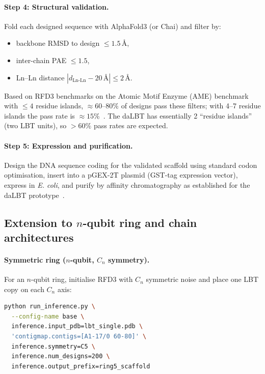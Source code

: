 \documentclass[11pt,oneside]{amsbook}
\numberwithin{equation}{section}
\theoremstyle{plain}
\theoremstyle{definition}
\theoremstyle{remark}
\begin{document}
\paragraph{Step 4: Structural validation.}
Fold each designed sequence with AlphaFold3 (or Chai) and filter by:
\begin{itemize}
  \item backbone RMSD to design $\le 1.5\,\text{\AA}$,
  \item inter-chain PAE $\le 1.5$,
  \item Ln--Ln distance $|d_{\text{Ln-Ln}} - 20\,\text{\AA}| \le 2\,\text{\AA}$.
\end{itemize}
Based on RFD3 benchmarks on the Atomic Motif Enzyme (AME) benchmark with
$\le 4$ residue islands, $\approx 60$--$80\%$ of designs pass these filters;
with 4--7 residue islands the pass rate is $\approx 15$\%~\cite{ButcherEtAl2025}.
The daLBT has essentially 2 ``residue islands'' (two LBT units), so $> 60\%$
pass rates are expected.

\paragraph{Step 5: Expression and purification.}
Design the DNA sequence coding for the validated scaffold using standard codon
optimisation, insert into a pGEX-2T plasmid (GST-tag expression vector),
express in \textit{E. coli}, and purify by affinity chromatography as
established for the daLBT prototype~\cite{RosalenyEtAl2017}.

\subsection{Extension to $n$-qubit ring and chain architectures}
\label{subsec:pqpu_nqubit}

\paragraph{Symmetric ring ($n$-qubit, $C_n$ symmetry).}
For an $n$-qubit ring, initialise RFD3 with $C_n$ symmetric noise and place one
LBT copy on each $C_n$ axis:
\begin{lstlisting}[language=bash,basicstyle=\small\ttfamily,
                   caption={Symmetric ring scaffold for $n$-qubit QPU (example $n=5$)},
                   label={lst:rfd3_ring}]
python run_inference.py \
  --config-name base \
  inference.input_pdb=lbt_single.pdb \
  'contigmap.contigs=[A1-17/0 60-80]' \
  inference.symmetry=C5 \
  inference.num_designs=200 \
  inference.output_prefix=ring5_scaffold
\end{lstlisting}
\end{document}

